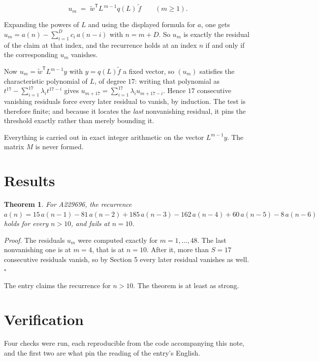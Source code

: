 \documentclass[11pt]{article}
\newtheorem{theorem}{Theorem}
\theoremstyle{definition}
\begin{document}
\[u_m \;=\; \tilde w^{\mathsf T} L^{\,m-1} q(L)\,\tilde f \qquad (m \ge 1).\]

Expanding the powers of $L$ and using the displayed formula for $a$, one gets $u_m = a(n) - \sum_{i=1}^{D} c_i\,a(n-i)$ with $n = m + D$. So $u_m$ is exactly the residual of the claim at that index, and the recurrence holds at an index $n$ if and only if the corresponding $u_m$ vanishes.

Now $u_m = \tilde w^{\mathsf T} L^{m-1} y$ with $y = q(L)\tilde f$ a fixed vector, so $(u_m)$ satisfies the characteristic polynomial of $L$, of degree $17$: writing that polynomial as $t^{17} - \sum_{i=1}^{17} \lambda_i t^{17-i}$ gives $u_{m+17} = \sum_{i=1}^{17} \lambda_i u_{m+17-i}$. Hence $17$ consecutive vanishing residuals force every later residual to vanish, by induction. The test is therefore finite; and because it locates the {\itshape last} nonvanishing residual, it pins the threshold exactly rather than merely bounding it.

Everything is carried out in exact integer arithmetic on the vector $L^{m-1}y$. The matrix $M$ is never formed.

\section{Results}

\begin{theorem} For A229696, the recurrence $a(n) = 15\,a(n-1) - 81\,a(n-2) + 185\,a(n-3) - 162\,a(n-4) + 60\,a(n-5) - 8\,a(n-6)$ holds for every $n > 10$, and fails at $n = 10$.\end{theorem}

{\itshape Proof.} The residuals $u_m$ were computed exactly for $m = 1,\dots,48$. The last nonvanishing one is at $m = 4$, that is at $n = 10$. After it, more than $S = 17$ consecutive residuals vanish, so by Section 5 every later residual vanishes as well. $\square$

The entry claims the recurrence for $n > 10$. The theorem is at least as strong.

\section{Verification}

Four checks were run, each reproducible from the code accompanying this note, and the first two are what pin the reading of the entry's English.
\end{document}
